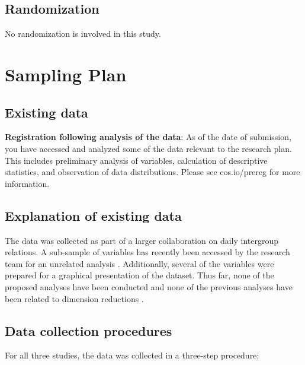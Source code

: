 \documentclass[]{article}
\begin{document}
\hypertarget{randomization}{%
\subsection{Randomization}\label{randomization}}

No randomization is involved in this study.

\hypertarget{sampling-plan}{%
\section{Sampling Plan}\label{sampling-plan}}

\hypertarget{existing-data}{%
\subsection{Existing data}\label{existing-data}}

\textbf{Registration following analysis of the data}: As of the date of
submission, you have accessed and analyzed some of the data relevant to
the research plan. This includes preliminary analysis of variables,
calculation of descriptive statistics, and observation of data
distributions. Please see cos.io/prereg for more information.

\hypertarget{explanation-of-existing-data}{%
\subsection{Explanation of existing
data}\label{explanation-of-existing-data}}

The data was collected as part of a larger collaboration on daily
intergroup relations. A sub-sample of variables has recently been
accessed by the research team for an unrelated analysis
\citep{Kreienkamp2022b}. Additionally, several of the variables were
prepared for a graphical presentation of the dataset. Thus far, none of
the proposed analyses have been conducted and none of the previous
analyses have been related to dimension reductions
.

\hypertarget{data-collection-procedures}{%
\subsection{Data collection
procedures}\label{data-collection-procedures}}

For
all three studies, the data was collected in a three-step procedure:
\end{document}
